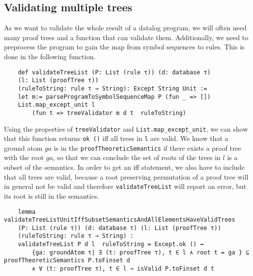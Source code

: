 \subsection{Validating multiple trees}

As we want to validate the whole result of a datalog program, we will often need many proof trees and a function that can validate them. Additionally, we need to preprocess the program to gain the map from symbol sequences to rules. This is done in the following function.

\begin{lstlisting}
    def validateTreeList (P: List (rule τ)) (d: database τ) 
    (l: List (proofTree τ)) 
    (ruleToString: rule τ → String): Except String Unit :=
    let m:= parseProgramToSymbolSequenceMap P (fun _ => [])
    List.map_except_unit l 
        (fun t => treeValidator m d t  ruleToString)

\end{lstlisting}

Using the properties of \texttt{treeValidator} and \texttt{List.map\_except\_unit}, we can show that this function returns \texttt{ok ()} iff all trees in \texttt{l} are valid. We know that a ground atom $ga$ is in the \texttt{proofTheoreticSemantics} if there exists a proof tree with the root $ga$, so that we can conclude the set of roots of the trees in $l$ is a subset of the semantics. In order to get an iff statement, we also have to include that all trees are valid, because a root preserving permutation of a proof tree will in general not be valid and therefore \texttt{validateTreeList} will report an error, but its root is still in the semantics.

\begin{lstlisting}
    lemma validateTreeListUnitIffSubsetSemanticsAndAllElementsHaveValidTrees 
    (P: List (rule τ)) (d: database τ) (l: List (proofTree τ)) 
    (ruleToString: rule τ → String) : 
    validateTreeList P d l  ruleToString = Except.ok () ↔ 
        {ga: groundAtom τ| ∃ (t: proofTree τ), t ∈ l ∧ root t = ga } ⊆ proofTheoreticSemantics P.toFinset d 
        ∧ ∀ (t: proofTree τ), t ∈ l → isValid P.toFinset d t
\end{lstlisting}

